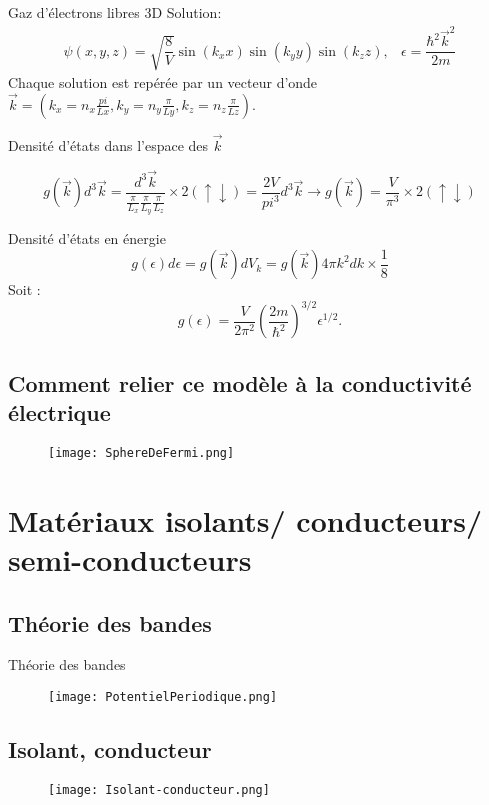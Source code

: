 \documentclass[10pt]{beamer}
\begin{document}
\begin{frame}{Gaz d'électrons libres 3D}
    Solution: 
    \begin{equation}
        \begin{array}{cc}
        \psi(x,y,z) = \sqrt{\dfrac{8}{V}}\sin(k_x x)\sin(k_y y)\sin(k_z z), & \epsilon = \dfrac{\hbar^2\vec{k}^2}{2m}
        \end{array}
    \end{equation}
Chaque solution est repérée par un vecteur d'onde $\vec{k} = \left(k_x=n_x\frac{pi}{Lx}, k_y=n_y\frac{\pi}{Ly}, k_z=n_z\frac{\pi}{Lz}\right)$.
\pause

Densité d'états dans l'espace des $\vec{k}$

\begin{equation}
    g(\vec{k})d^3\vec{k}=\dfrac{d^3\vec{k}}{\frac{\pi}{L_x}\frac{\pi}{L_y}\frac{\pi}{L_z}}\times 2 (\uparrow\downarrow) = \dfrac{2V}{pi^3}d^3\vec{k}\rightarrow g(\vec{k})=\dfrac{V}{\pi^3}\times 2(\uparrow\downarrow)
\end{equation}


Densité d'états en énergie
\[g(\epsilon)d\epsilon=g(\vec{k})dV_{k}=g(\vec{k})4\pi k^2dk\times \dfrac{1}{8}\]
Soit : 
\begin{equation}
g(\epsilon) = \dfrac{V}{2\pi^2}\left(\dfrac{2m}{\hbar^2}\right)^{3/2}\epsilon^{1/2}.    
\end{equation}
\end{frame}

\subsection{Comment relier ce modèle à la conductivité électrique}
\begin{frame}{\insertsubsection}
    \begin{figure}
        \centering
        \texttt{[image: SphereDeFermi.png]}
    \end{figure}
\end{frame}
\section{Matériaux isolants/ conducteurs/ semi-conducteurs}

\subsection{Théorie des bandes}

\begin{frame}{Théorie des bandes}
    \begin{figure}
        \centering
        \texttt{[image: PotentielPeriodique.png]}
    \end{figure}
\end{frame}

\subsection{Isolant, conducteur}
\begin{frame}{\insertsubsection}
    \begin{figure}
        \centering
        \texttt{[image: Isolant-conducteur.png]}
    \end{figure}
\end{frame}
\end{document}
